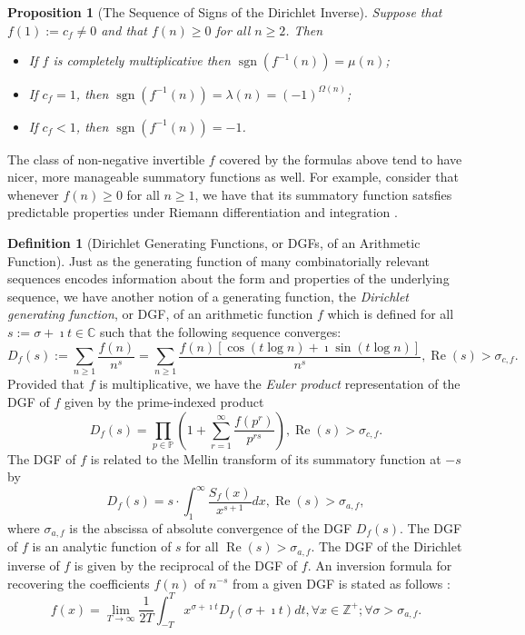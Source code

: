 \documentclass[11pt,reqno]{amsart}
\numberwithin{figure}{section}
\numberwithin{table}{section}
\newcommand{\cf}{\textit{cf.\ }}
\DeclareMathOperator{\sgn}{sgn}
\renewcommand{\Re}{\operatorname{Re}}
\theoremstyle{plain}
\newtheorem{prop}[theorem]{Proposition}
\numberwithin{theorem}{section}
\theoremstyle{definition}
\newtheorem{definition}[theorem]{Definition}
\begin{document}
\begin{prop}[The Sequence of Signs of the Dirichlet Inverse] 
\label{prop_SeqOfSignsOfDirInv_SpCases_stmt_intro_v1} 
Suppose that $f(1) := c_f \neq 0$ and that $f(n) \geq 0$ for all $n \geq 2$. Then 
\begin{itemize} 

\item[1.] If $f$ is completely multiplicative then $\sgn(f^{-1}(n)) = \mu(n)$; 
\item[2.] If $c_f = 1$, then $\sgn(f^{-1}(n)) = \lambda(n) = (-1)^{\Omega(n)}$; 
\item[3.] If $c_f < 1$, then $\sgn(f^{-1}(n)) = -1$. 

\end{itemize} 
\end{prop} 

The class of non-negative invertible $f$ covered by the formulas above tend to have 
nicer, more manageable summatory functions as well. For example, consider that 
whenever $f(n) \geq 0$ for all $n \geq 1$, we have that its summatory function 
satsfies predictable properties under Riemann differentiation and integration 
\cite[\cf \S 13]{APOSTOL-ANUMT}. 

\begin{definition}[Dirichlet Generating Functions, or DGFs, of an Arithmetic Function] 
Just as the generating function of many combinatorially relevant sequences encodes 
information about the form and properties of the underlying sequence, we have another 
notion of a generating function, the \emph{Dirichlet generating function}, or DGF, of 
an arithmetic function $f$ which is defined for all 
$s := \sigma+\imath t \in \mathbb{C}$ such that the 
following sequence converges: 
\[
D_f(s) := \sum_{n \geq 1} \frac{f(n)}{n^s} = 
     \sum_{n \geq 1} \frac{f(n) \left[\cos(t \log n) + \imath \sin(t \log n)\right]}{n^s}, 
     \Re(s) > \sigma_{c,f}. 
\]
Provided that $f$ is multiplicative, we have the \emph{Euler product} representation of the DGF 
of $f$ given by the prime-indexed product
\[
D_f(s) = \prod_{p \in \mathbb{P}} \left(1 + \sum_{r=1}^{\infty} \frac{f(p^r)}{p^{rs}}\right), 
     \Re(s) > \sigma_{c,f}. 
\]
The DGF of $f$ is related to the Mellin transform of its summatory function at 
$-s$ by 
\[
D_f(s) = s \cdot \int_1^{\infty} \frac{S_f(x)}{x^{s+1}} dx, \Re(s) > \sigma_{a,f}, 
\]
where $\sigma_{a,f}$ is the abscissa of absolute convergence of the DGF $D_f(s)$. 
The DGF of $f$ is an analytic function of $s$ for all $\Re(s) > \sigma_{a,f}$. 
The DGF of the Dirichlet inverse of $f$ is given by the reciprocal of the 
DGF of $f$. An inversion formula for recovering the coefficients $f(n)$ of $n^{-s}$ 
from a given DGF is stated as follows \cite[\S 11.11]{APOSTOL-ANUMT}: 
\[
f(x) = \lim_{T \rightarrow \infty} \frac{1}{2T} \int_{-T}^{T} x^{\sigma+\imath t} 
     D_f(\sigma + \imath t) dt, \forall x \in \mathbb{Z}^{+}; 
     \forall \sigma > \sigma_{a,f}. 
\]
\end{definition} 
\end{document}
